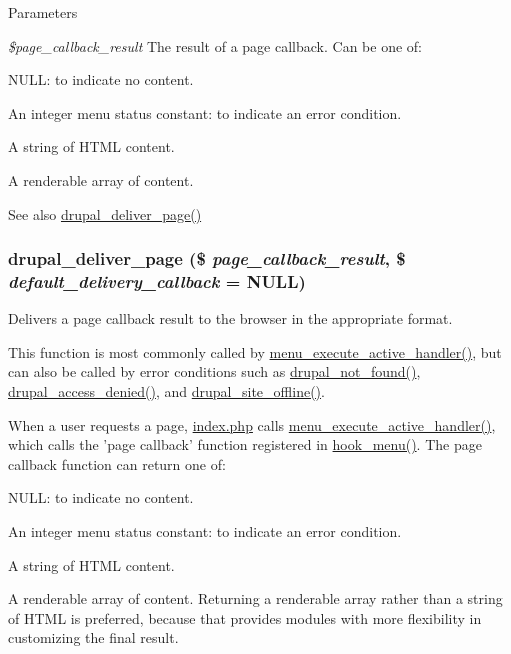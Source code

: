 \begin{DoxyParams}{Parameters}
\item[{\em \$page\_\-callback\_\-result}]The result of a page callback. Can be one of:
\begin{DoxyItemize}
\item NULL: to indicate no content.
\item An integer menu status constant: to indicate an error condition.
\item A string of HTML content.
\item A renderable array of content.
\end{DoxyItemize}\end{DoxyParams}
\begin{DoxySeeAlso}{See also}
\hyperlink{common_8inc_a1537b4ccc064fb7d8106effcac8caac3}{drupal\_\-deliver\_\-page()} 
\end{DoxySeeAlso}
\hypertarget{common_8inc_a1537b4ccc064fb7d8106effcac8caac3}{
\subsubsection[{drupal\_\-deliver\_\-page}]{\setlength{\rightskip}{0pt plus 5cm}drupal\_\-deliver\_\-page (\$ {\em page\_\-callback\_\-result}, \/  \$ {\em default\_\-delivery\_\-callback} = {\ttfamily NULL})}}
\label{common_8inc_a1537b4ccc064fb7d8106effcac8caac3}
Delivers a page callback result to the browser in the appropriate format.

This function is most commonly called by \hyperlink{group__menu_gae33bae24fcac6126aa272d1c437f947c}{menu\_\-execute\_\-active\_\-handler()}, but can also be called by error conditions such as \hyperlink{group__http__handling_ga52b08cd98e1756326c1bd5b56c39a884}{drupal\_\-not\_\-found()}, \hyperlink{group__http__handling_ga0bbff371f9373002e71f2e1347fcf481}{drupal\_\-access\_\-denied()}, and \hyperlink{group__http__handling_gafc3a1915f45be2ac8666778eef0e9758}{drupal\_\-site\_\-offline()}.

When a user requests a page, \hyperlink{index_8php}{index.php} calls \hyperlink{group__menu_gae33bae24fcac6126aa272d1c437f947c}{menu\_\-execute\_\-active\_\-handler()}, which calls the 'page callback' function registered in \hyperlink{group__hooks_ga5c95244fea59b25666e409759e133ded}{hook\_\-menu()}. The page callback function can return one of:
\begin{DoxyItemize}
\item NULL: to indicate no content.
\item An integer menu status constant: to indicate an error condition.
\item A string of HTML content.
\item A renderable array of content. Returning a renderable array rather than a string of HTML is preferred, because that provides modules with more flexibility in customizing the final result.
\end{DoxyItemize}

